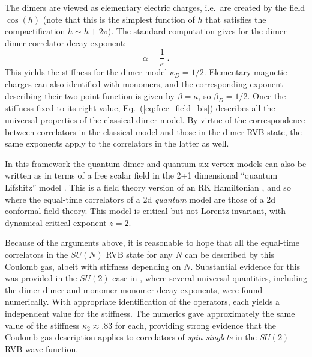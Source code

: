 \documentclass[11pt]{iopart}
\begin{document}
The dimers are viewed as elementary electric charges, i.e.\ are created by the field $\cos(h)$ (note that this is the simplest function of $h$ that satisfies the compactification $h\sim h+2\pi$). The standard computation \cite{Nienhuis} gives for the dimer-dimer correlator decay exponent:
\begin{equation}
 \alpha=\frac{1}{\kappa}\ .
\end{equation}
This yields the stiffness for the dimer model $\kappa_D=1/2$. Elementary magnetic charges can also identified with monomers, and the corresponding exponent describing their two-point function is given by $\beta=\kappa$, so $\beta_D=1/2$.
Once the stiffness fixed to its right value, Eq.~(\ref{eq:free_field_bis}) describes all the universal properties of the classical dimer model. By virtue of the correspondence between correlators in the classical model and those in the dimer RVB state, the same exponents apply to the correlators in the latter as well. 

In this framework the quantum dimer and quantum six vertex models can also be written as in terms of a free scalar field in the 2+1 dimensional ``quantum Lifshitz'' model \cite{Henley}. This is a field theory version of an RK Hamiltonian \cite{QuantumLifshitz}, and so where the equal-time correlators of a 2d {\em quantum} model are those of a 2d conformal field theory. This model is critical but not Lorentz-invariant, with dynamical critical exponent $z=2$.

Because of the arguments above, it is reasonable to hope that all the equal-time correlators in the $SU(N)$ RVB state for any $N$ can be described by this Coulomb gas, albeit with stiffness depending on $N$. Substantial evidence for this was provided in the $SU(2)$ case in \cite{RVB2}, where several universal quantities, including the dimer-dimer and monomer-monomer decay exponents, were found numerically. With appropriate identification of the operators, each yields a independent value for the stiffness.  The numerics gave approximately the same value of the stiffness $\kappa_{2}\approx .83$ for each, providing strong evidence that the Coulomb gas description applies to correlators of {\em spin singlets} in the $SU(2)$ RVB wave function. 

\end{document}
